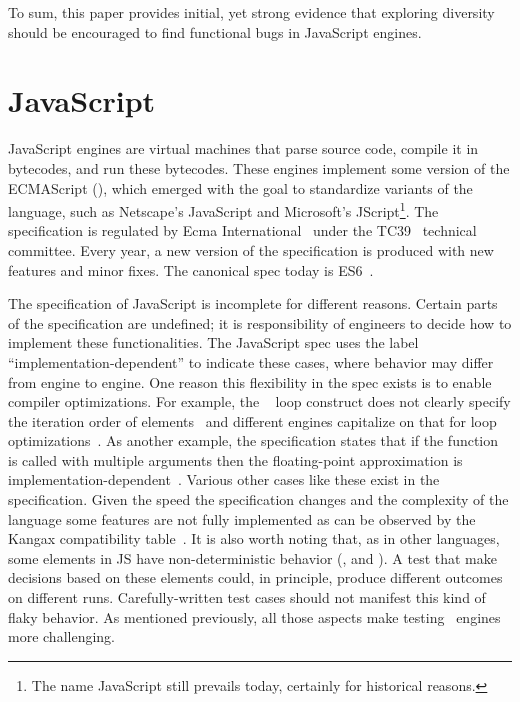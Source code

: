 \documentclass[sigconf,review, anonymous]{acmart}
\begin{document}
\vspace{1ex} To sum, this paper provides initial, yet strong evidence
that exploring diversity should be encouraged to find functional bugs
in JavaScript engines.

\section{JavaScript}
\label{sec:es6-design}
\label{sec:imp-dep-behavior}

JavaScript engines are virtual machines that parse source code,
compile it in bytecodes, and run these bytecodes. These engines
implement some version of the ECMAScript (\es{}), which emerged with
the goal to standardize variants of the language, such as Netscape's
JavaScript and Microsoft's JScript\footnote{The name JavaScript still
  prevails today, certainly for historical reasons.}. The \es{}
specification is regulated by Ecma International~\cite{es6-website}
under the TC39~\cite{tc39-github} technical committee.  Every year, a
new version of the \es{} specification is produced with new features
and minor fixes. The canonical spec today is
ES6~\cite{ecmas262-spec-repo,ecmas262-spec}.


The specification of JavaScript is incomplete for different
reasons. Certain parts of the specification are undefined; it is
responsibility of engineers to decide how to implement these
functionalities. The JavaScript spec uses the label
``implementation-dependent'' to indicate these cases, where behavior
may differ from engine to engine. One reason this flexibility in the
spec exists is to enable compiler optimizations. For example, the
\js\  loop construct does not clearly specify the
iteration order of
elements~\cite{so-forin-undefined,javascript-in-chrome} and different
engines capitalize on that for loop
optimizations~\cite{for-in-undefined}.  As another example, the
specification states that if the 
function is called with multiple arguments then the floating-point
approximation is
implementation-dependent~\cite{es6-toPrecision}. Various other cases
like these exist in the specification. Given the speed the
specification changes and the complexity of the language some features
are not fully implemented as can be observed by the Kangax
compatibility table~\cite{kangax}.  It is also worth noting that, as
in other languages, some elements in JS have non-deterministic
behavior (\eg{},  and ). A test
that make decisions based on these elements could, in principle,
produce different outcomes on different runs. Carefully-written test
cases should not manifest this kind of flaky behavior.  As mentioned
previously, all those aspects make testing \js\ engines more
challenging.
\end{document}
